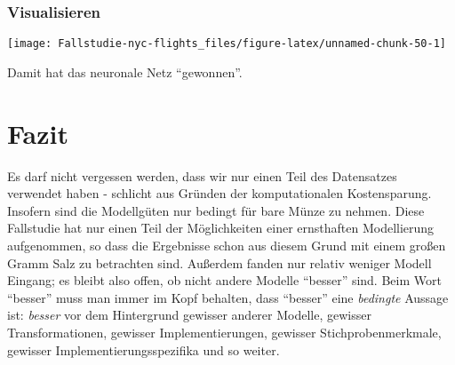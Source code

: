 \documentclass[]{article}
\newenvironment{Shaded}{\begin{snugshade}}{\end{snugshade}}
\newcommand{\DataTypeTok}[1]{\textcolor[rgb]{0.13,0.29,0.53}{#1}}
\newcommand{\DecValTok}[1]{\textcolor[rgb]{0.00,0.00,0.81}{#1}}
\newcommand{\KeywordTok}[1]{\textcolor[rgb]{0.13,0.29,0.53}{\textbf{#1}}}
\newcommand{\NormalTok}[1]{#1}
\newcommand{\OperatorTok}[1]{\textcolor[rgb]{0.81,0.36,0.00}{\textbf{#1}}}
\newcommand{\StringTok}[1]{\textcolor[rgb]{0.31,0.60,0.02}{#1}}
\begin{document}
\hypertarget{visualisieren}{%
\subsubsection{Visualisieren}\label{visualisieren}}

\begin{Shaded}
\end{Shaded}

\begin{center}\texttt{[image: Fallstudie-nyc-flights\_files/figure-latex/unnamed-chunk-50-1]} \end{center}

Damit hat das neuronale Netz ``gewonnen''.

\hypertarget{fazit}{%
\section{Fazit}\label{fazit}}

Es darf nicht vergessen werden, dass wir nur einen Teil des Datensatzes
verwendet haben - schlicht aus Gründen der komputationalen
Kostensparung. Insofern sind die Modellgüten nur bedingt für bare Münze
zu nehmen. Diese Fallstudie hat nur einen Teil der Möglichkeiten einer
ernsthaften Modellierung aufgenommen, so dass die Ergebnisse schon aus
diesem Grund mit einem großen Gramm Salz zu betrachten sind. Außerdem
fanden nur relativ weniger Modell Eingang; es bleibt also offen, ob
nicht andere Modelle ``besser'' sind. Beim Wort ``besser'' muss man
immer im Kopf behalten, dass ``besser'' eine \emph{bedingte} Aussage
ist: \emph{besser} vor dem Hintergrund gewisser anderer Modelle,
gewisser Transformationen, gewisser Implementierungen, gewisser
Stichprobenmerkmale, gewisser Implementierungsspezifika und so weiter.
\end{document}
